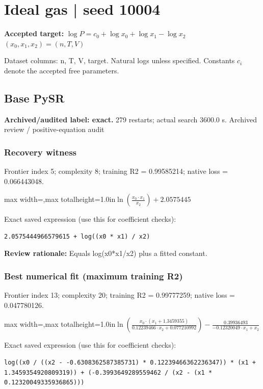 \documentclass[10pt,letterpaper,landscape]{article}
\begin{document}
\section*{Ideal gas | seed 10004}
\textbf{Accepted target:} $\displaystyle \log P=c_0+\log x_0+\log x_1-\log x_2$\hfill $(x_0,x_1,x_2)=(n,T,V)$\par
{\small Dataset columns: n, T, V, target. Natural logs unless specified. Constants $c_i$ denote the accepted free parameters.}\par\medskip
\begin{minipage}[t]{0.485\textwidth}
\subsection*{Base PySR}
\textbf{Archived/audited label: exact.} 279 restarts; actual search 3600.0 s.
{\small Archived review / positive-equation audit}
\subsubsection*{Recovery witness}
Frontier index 5; complexity 8; training R2 = 0.99585214; native loss = 0.066443048.
\begin{center}\begin{adjustbox}{max width=\linewidth,max totalheight=1.0in}$\displaystyle \ln{\left(\frac{x_{0} \cdot x_{1}}{x_{2}} \right)} + 2.0575445$\end{adjustbox}\end{center}
{\scriptsize Exact saved expression (use this for coefficient checks):}
\begin{lstlisting}
2.0575444966579615 + log((x0 * x1) / x2)
\end{lstlisting}
{\small\textbf{Review rationale:} Equals log(x0*x1/x2) plus a fitted constant.}
\subsubsection*{Best numerical fit (maximum training R2)}
Frontier index 13; complexity 20; training R2 = 0.99777259; native loss = 0.047780126.
\begin{center}\begin{adjustbox}{max width=\linewidth,max totalheight=1.0in}$\displaystyle \ln{\left(\frac{x_{0} \cdot \left(x_{1} + 1.3459355\right)}{0.12239466 \cdot x_{2} + 0.077210992} \right)} - \frac{0.39936493}{- 0.12320049 \cdot x_{1} + x_{2}}$\end{adjustbox}\end{center}
{\scriptsize Exact saved expression (use this for coefficient checks):}
\begin{lstlisting}
log((x0 / ((x2 - -0.6308362587385731) * 0.12239466362236347)) * (x1 + 1.3459354920809319)) + (-0.3993649289559462 / (x2 - (x1 * 0.12320049335936865)))
\end{lstlisting}
\end{minipage}\hfill
\end{document}
